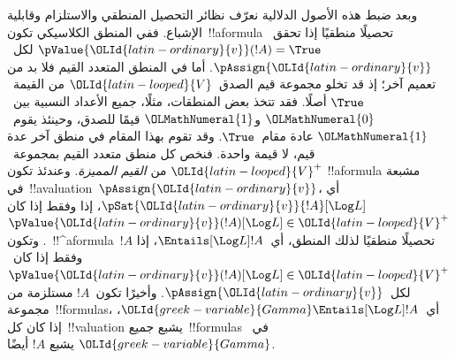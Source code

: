 \documentclass[../../../include/open-logic-section]{subfiles}
\begin{document}
وبعد ضبط هذه الأصول الدلالية نعرّف نظائر التحصيل المنطقي والاستلزام
وقابلية الإشباع. ففي المنطق الكلاسيكي تكون~!!a{formula} تحصيلًا
منطقيًا إذا تحقق~$\pValue{\OLId{latin-ordinary}{v}}(!A) = \True$ لكل~$\pAssign{\OLId{latin-ordinary}{v}}$.
أما في المنطق المتعدد القيم فلا بد من تعميم آخر؛ إذ قد تخلو مجموعة
قيم الصدق~$\OLId{latin-looped}{V}$ من القيمة~$\True$ أصلًا. فقد تتخذ بعض المنطقات، مثلًا، جميع الأعداد
النسبية بين~$\OLMathNumeral{0}$ و$\OLMathNumeral{1}$ قيمًا للصدق، وحينئذ يقوم~$\OLMathNumeral{1}$ عادة مقام~$\True$.
وقد تقوم بهذا المقام في منطق آخر عدة قيم، لا قيمة واحدة. فنخص كل
منطق متعدد القيم بمجموعة~$\OLId{latin-looped}{V}^+$ من \emph{القيم المميزة}. وعندئذ تكون
!!a{formula} مشبعة في~!!a{valuation}~$\pAssign{\OLId{latin-ordinary}{v}}$، أي
$\pSat{\OLId{latin-ordinary}{v}}{!A}[\Log L]$، إذا وفقط إذا كان
$\pValue{\OLId{latin-ordinary}{v}}(!A)[\Log L] \in \OLId{latin-looped}{V}^+$. وتكون~!!^a{formula}~$!A$
تحصيلًا منطقيًا لذلك المنطق، أي~$\Entails[\Log L] !A$، إذا وفقط إذا
كان~$\pValue{\OLId{latin-ordinary}{v}}(!A)[\Log L] \in \OLId{latin-looped}{V}^+$ لكل~$\pAssign{\OLId{latin-ordinary}{v}}$. وأخيرًا تكون~$!A$
مستلزمة من مجموعة~!!{formula}s، أي~$\OLId{greek-variable}{Gamma} \Entails[\Log L] !A$،
إذا كان كل~!!{valuation} يشبع جميع~!!{formula}s في~$\OLId{greek-variable}{Gamma}$ يشبع
$!A$ أيضًا.
\end{document}
